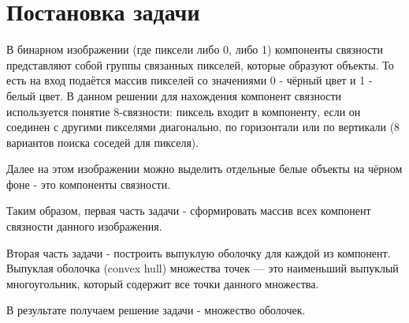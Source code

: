 \documentclass[12pt]{article}
\begin{document}
\newpage
       
\section{Постановка задачи}

В бинарном изображении (где пиксели либо 0, либо 1) компоненты связности представляют собой группы связанных пикселей, которые образуют объекты. То есть на вход подаётся массив пикселей со значениями 0 - чёрный цвет и 1 - белый цвет. В данном решении для нахождения компонент связности используется понятие 8-связности: пиксель входит в компоненту, если он соединен с другими пикселями диагонально, по горизонтали или по вертикали (8 вариантов поиска соседей для пикселя).

Далее на этом изображении можно выделить отдельные белые объекты на чёрном фоне - это компоненты связности.

Таким образом, первая часть задачи - сформировать массив всех компонент связности данного изображения.

Вторая часть задачи - построить выпуклую оболочку для каждой из компонент. Выпуклая оболочка (convex hull) множества точек — это наименьший выпуклый многоугольник, который содержит все точки данного множества.

В результате получаем решение задачи - множество оболочек.

\newpage
\end{document}
